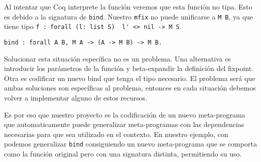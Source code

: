 Al intentar que Coq interprete la función veremos que esta función no tipa.
Esto es debido a la signatura de \lstinline{bind}.
Nuestro \lstinline{mfix} no puede unificarse a \lstinline{M B}, ya que tiene
tipo \lstinline{f : forall (l: list S)  l' <> nil -> M S}.

\begin{lstlisting}
bind : forall A B, M A -> (A -> M B) -> M B.
\end{lstlisting}

Solucionar esta situación específica no es un problema.
Una alternativa es introducir los parámetros de la función y beta-expandir la definición del fixpoint.
Otra es codificar un nuevo bind que tenga el tipo necesario.
El problema será que ambas soluciones son específicas al problema, entonces en cada situación debemos volver a implementar alguno de estos recursos.

Es por eso que nuestro proyecto es la codificación de un nuevo meta-programa \lift{} que automaticamente puede generalizar meta-programas con las dependencias necesarias para que sea utilizado en el contexto.
En nuestro ejemplo, con \lift{} podemos generalizar \lstinline{bind} consiguiendo un nuevo meta-programa que se comporta como la función original pero con una signatura distinta, permitiendo su uso.
